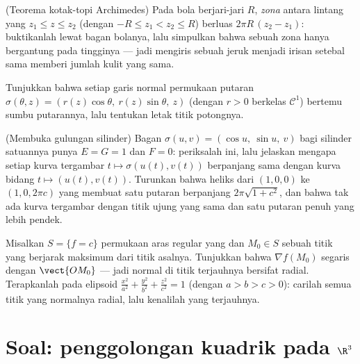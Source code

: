 \begin{exercise}[$\star$]\label{exo:b2:surfaces:9}
(Teorema kotak-topi Archimedes) Pada bola berjari-jari $R$,
\emph{zona} antara lintang yang $z_1 \leq z \leq z_2$
(dengan $-R \leq z_1 < z_2 \leq R$) berluas $2\pi R\,(z_2 - z_1)$:
buktikanlah lewat bagan bolanya, lalu simpulkan bahwa  sebuah zona
hanya bergantung pada tingginya --- jadi mengiris sebuah jeruk menjadi
irisan setebal sama memberi jumlah kulit yang sama.
\end{exercise}

\begin{exercise}[$\star\star$]\label{exo:b2:surfaces:10}
Tunjukkan bahwa setiap garis normal permukaan putaran
$\sigma(\theta, z) = (r(z)\cos\theta,\ r(z)\sin\theta,\ z)$
(dengan $r > 0$ berkelas $\mathcal C^1$) bertemu sumbu
putarannya, lalu tentukan letak titik potongnya.
\end{exercise}

\begin{exercise}[$\star\star$]\label{exo:b2:surfaces:11}
(Membuka gulungan silinder) Bagan $\sigma(u, v) = (\cos u,\
\sin u,\ v)$ bagi silinder satuannya punya $E = G = 1$ dan $F = 0$:
periksalah ini, lalu jelaskan mengapa setiap kurva tergambar $t \mapsto
\sigma(u(t), v(t))$ berpanjang sama dengan kurva bidang $t
\mapsto (u(t), v(t))$. Turunkan bahwa heliks dari $(1, 0, 0)$
ke $(1, 0, 2\pi c)$ yang membuat satu putaran berpanjang
$2\pi\sqrt{1 + c^2}$, dan bahwa tak ada kurva tergambar dengan
titik ujung yang sama dan satu putaran penuh yang lebih pendek.
\end{exercise}

\begin{exercise}[$\star\star\star$]\label{exo:b2:surfaces:12}
Misalkan $S = \{f = c\}$ permukaan aras regular yang  dan
$M_0 \in S$ sebuah titik yang berjarak maksimum dari titik asalnya. Tunjukkan
bahwa $\nabla f(M_0)$ segaris dengan $\vect{OM_0}$ --- jadi
normal di titik terjauhnya bersifat radial. Terapkanlah pada elipsoid
$\frac{x^2}{a^2} + \frac{y^2}{b^2} + \frac{z^2}{c^2} = 1$ (dengan $a >
b > c > 0$): carilah semua titik yang normalnya radial, lalu
kenalilah yang terjauhnya.
\end{exercise}

\section{Soal: penggolongan kuadrik pada
$\R^3$}

